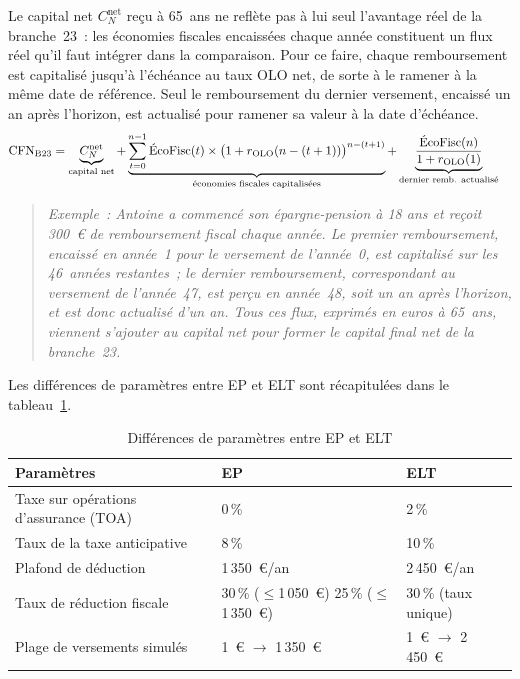 ﻿\documentclass[12pt, a4paper]{article}
\begin{document}
Le capital net $C_N^{\text{net}}$ reçu à 65~ans ne reflète pas à lui seul
l'avantage réel de la branche~23~: les économies fiscales encaissées chaque
année constituent un flux réel qu'il faut intégrer dans la comparaison.
Pour ce faire, chaque remboursement est capitalisé jusqu'à l'échéance au
taux OLO net, de sorte à le ramener à la même date de référence. Seul le
remboursement du dernier versement, encaissé un an après l'horizon, est
actualisé pour ramener sa valeur à la date d'échéance.
\begin{align}
  \text{CFN}_{\text{B23}} &=
    \underbrace{%
      C_N^{\text{net}}
    }_{\text{capital net}}
  +
    \underbrace{%
      \sum_{t=0}^{n-1}
      \text{ÉcoFisc}(t) \times
      \bigl(1 + r_{\text{OLO}}(n-(t+1))\bigr)^{n-(t+1)}
    }_{\text{économies fiscales capitalisées}}
  +
    \underbrace{%
      \dfrac{\text{ÉcoFisc}(n)}{1 + r_{\text{OLO}}(1)}
    }_{\text{dernier remb. actualisé}}
\end{align}

\begin{quote}
\textit{Exemple~: Antoine a commencé son épargne-pension à 18 ans et 
reçoit 300~€ de remboursement fiscal chaque année. Le
premier remboursement, encaissé en année~1 pour le versement de l'année~0,
est capitalisé sur les 46~années restantes~; le dernier remboursement,
correspondant au versement de l'année~47, est perçu en année~48, soit un
an après l'horizon, et est donc actualisé d'un an. Tous ces flux, exprimés
en euros à 65~ans, viennent s'ajouter au capital net pour former le capital
final net de la branche~23.}
\end{quote}

Les différences de paramètres entre EP et ELT sont récapitulées dans le
tableau~\ref{tab:diff_ep_elt}.

\begin{table}[h!]
  \centering
  \caption{Différences de paramètres entre EP et ELT}
  \label{tab:diff_ep_elt}
  \begin{tabular}{lll}
    \hline
    \textbf{Paramètres} & \textbf{EP} & \textbf{ELT} \\
    \hline
    Taxe sur opérations d'assurance (TOA) & 0\,\% & 2\,\% \\
    Taux de la taxe anticipative & 8\,\% & 10\,\% \\
    Plafond de déduction & 1\,350~€/an & 2\,450~€/an \\
    Taux de réduction fiscale
      & \makecell[l]{30\,\% ($\leq$1\,050~€) \\ 25\,\% ($\leq$1\,350~€)}
      & 30\,\% (taux unique) \\
    Plage de versements simulés & 1~€ $\to$ 1\,350~€ & 1~€ $\to$ 2\,450~€ \\
    \hline
  \end{tabular}
\end{table}
\end{document}
